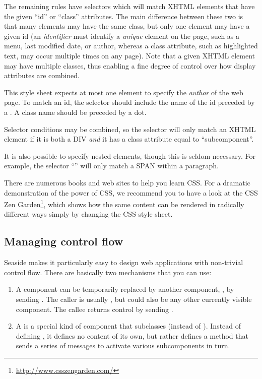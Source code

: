 \documentclass[a4paper,10pt,twoside]{book}
\begin{document}
The remaining rules have selectors which will match XHTML elements that have the given ``id'' or ``class'' attributes.
The main difference between these two is that many elements may have the same class, but only one element may have a given id (\ie an \emph{identifier} must identify a \emph{unique} element on the page, such as a menu, last modified date, or author, whereas a class attribute, such as highlighted text, may occur multiple times on any page).
Note that a given XHTML element may have multiple classes, thus enabling a fine degree of control over how display attributes are combined.

This style sheet expects at most one element to specify the \emph{author} of the web page.
To match an id, the selector should include the name of the id preceded by a \ct{#}.
A class name should be preceded by a dot.

Selector conditions may be combined, so the selector  will only match an XHTML element if it is both a DIV \emph{and} it has a class attribute equal to ``subcomponent''.

It is also possible to specify nested elements, though this is seldom necessary.
For example, the selector ``'' will only match a SPAN within a paragraph.

There are numerous books and web sites to help you learn CSS.
For a dramatic demonstration of the power of CSS, we recommend you to have a look at the CSS Zen Garden\footnote{\url{http://www.csszengarden.com/}}, which shows how the same content can be rendered in radically different ways simply by changing the CSS style sheet.

\subsection{Managing control flow}

Seaside makes it particularly easy to design web applications with non-trivial control flow.
There are basically two mechanisms that you can use:

\begin{enumerate}
  \item A component  can be temporarily replaced by another component, , by sending .
  The caller is usually , but could also be any other currently visible component.
  The callee returns control by sending .

  \item A  is a special kind of component that subclasses  (instead of ).
  Instead of defining , it defines no content of its own, but rather defines a  method that sends a series of  messages to activate various subcomponents in turn.
\end{enumerate}
\end{document}
